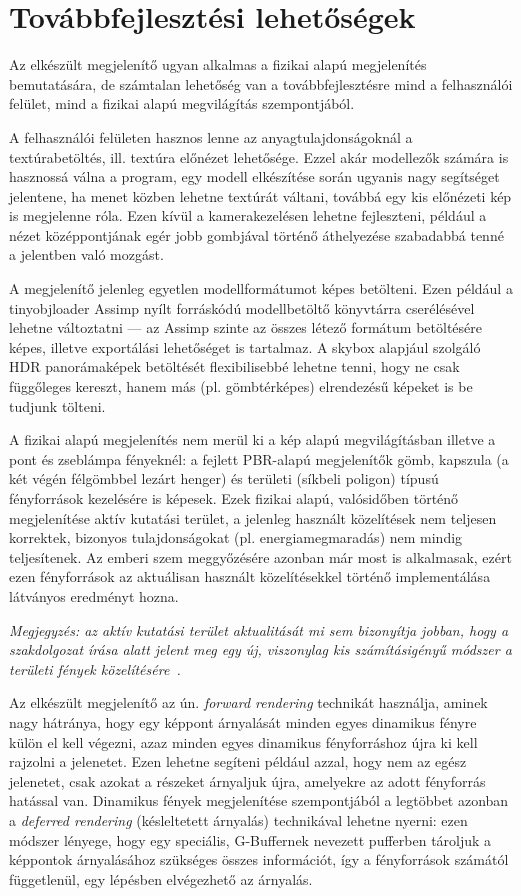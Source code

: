 \section{Továbbfejlesztési lehetőségek}
\label{sec:further_dev}

Az elkészült megjelenítő ugyan alkalmas a fizikai alapú megjelenítés bemutatására, de számtalan lehetőség van a továbbfejlesztésre mind a felhasználói felület, mind a fizikai alapú megvilágítás szempontjából.

A felhasználói felületen hasznos lenne az anyagtulajdonságoknál a textúrabetöltés, ill. textúra előnézet lehetősége. Ezzel akár modellezők számára is hasznossá válna a program, egy modell elkészítése során ugyanis nagy segítséget jelentene, ha menet közben lehetne textúrát váltani, továbbá egy kis előnézeti kép is megjelenne róla. Ezen kívül a kamerakezelésen lehetne fejleszteni, például a nézet középpontjának egér jobb gombjával történő áthelyezése szabadabbá tenné a jelentben való mozgást.

A megjelenítő jelenleg egyetlen modellformátumot képes betölteni. Ezen például a tinyobjloader Assimp nyílt forráskódú modellbetöltő könyvtárra cserélésével lehetne változtatni --- az Assimp szinte az összes létező formátum betöltésére képes, illetve exportálási lehetőséget is tartalmaz. A skybox alapjául szolgáló HDR panorámaképek betöltését flexibilisebbé lehetne tenni, hogy ne csak függőleges kereszt, hanem más (pl. gömbtérképes) elrendezésű képeket is be tudjunk tölteni.

A fizikai alapú megjelenítés nem merül ki a kép alapú megvilágításban illetve a pont és zseblámpa fényeknél: a fejlett PBR-alapú megjelenítők gömb, kapszula (a két végén félgömbbel lezárt henger) és területi (síkbeli poligon) típusú fényforrások kezelésére is képesek. Ezek fizikai alapú, valósidőben történő megjelenítése aktív kutatási terület, a jelenleg használt közelítések nem teljesen korrektek, bizonyos tulajdonságokat (pl. energiamegmaradás) nem mindig teljesítenek. Az emberi szem meggyőzésére azonban már most is alkalmasak, ezért ezen fényforrások az aktuálisan használt közelítésekkel történő implementálása látványos eredményt hozna.

\textit{Megjegyzés: az aktív kutatási terület aktualitását mi sem bizonyítja jobban, hogy a szakdolgozat írása alatt jelent meg egy új, viszonylag kis számításigényű módszer a területi fények közelítésére~\cite{real_time_area_light}. }

Az elkészült megjelenítő az ún. \textit{forward rendering} technikát használja, aminek nagy hátránya, hogy egy képpont árnyalását minden egyes dinamikus fényre külön el kell végezni, azaz minden egyes dinamikus fényforráshoz újra ki kell rajzolni a jelenetet. Ezen lehetne segíteni például azzal, hogy nem az egész jelenetet, csak azokat a részeket árnyaljuk újra, amelyekre az adott fényforrás hatással van. Dinamikus fények megjelenítése szempontjából a legtöbbet azonban a \textit{deferred rendering} (késleltetett árnyalás) technikával lehetne nyerni: ezen módszer lényege, hogy egy speciális, G-Buffernek nevezett pufferben tároljuk a képpontok árnyalásához szükséges összes információt, így a fényforrások számától függetlenül, egy lépésben elvégezhető az árnyalás.

